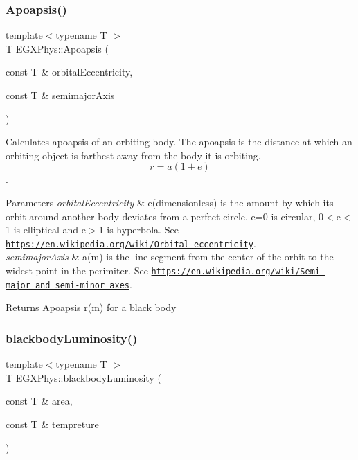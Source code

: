 \subsubsection{\texorpdfstring{Apoapsis()}{Apoapsis()}}
{\footnotesize\ttfamily template$<$typename T $>$ \\
T E\+G\+X\+Phys\+::\+Apoapsis (\begin{DoxyParamCaption}\item[{const T \&}]{orbital\+Eccentricity,  }\item[{const T \&}]{semimajor\+Axis }\end{DoxyParamCaption})}



Calculates apoapsis of an orbiting body. The apoapsis is the distance at which an orbiting object is farthest away from the body it is orbiting. \[r=a(1+e)\]. 


\begin{DoxyParams}{Parameters}
{\em orbital\+Eccentricity} & e(dimensionless) is the amount by which its orbit around another body deviates from a perfect circle. e=0 is circular, 0$<$e$<$1 is elliptical and e$>$1 is hyperbola. See \href{https://en.wikipedia.org/wiki/Orbital_eccentricity}{\tt https\+://en.\+wikipedia.\+org/wiki/\+Orbital\+\_\+eccentricity}. \\
\hline
{\em semimajor\+Axis} & a(m) is the line segment from the center of the orbit to the widest point in the perimiter. See \href{https://en.wikipedia.org/wiki/Semi-major_and_semi-minor_axes}{\tt https\+://en.\+wikipedia.\+org/wiki/\+Semi-\/major\+\_\+and\+\_\+semi-\/minor\+\_\+axes}. \\
\hline
\end{DoxyParams}
\begin{DoxyReturn}{Returns}
Apoapsis r(m) for a black body 
\end{DoxyReturn}
\mbox{\label{group___astrophysics_ga909f82edfaed449b44e94788b642ebb8}} 
\subsubsection{\texorpdfstring{blackbody\+Luminosity()}{blackbodyLuminosity()}}
{\footnotesize\ttfamily template$<$typename T $>$ \\
T E\+G\+X\+Phys\+::blackbody\+Luminosity (\begin{DoxyParamCaption}\item[{const T \&}]{area,  }\item[{const T \&}]{tempreture }\end{DoxyParamCaption})}



